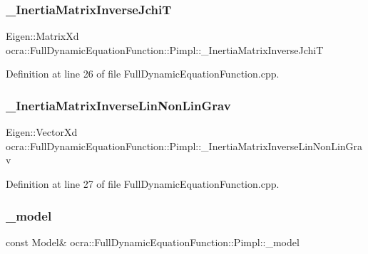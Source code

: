 \subsubsection{\texorpdfstring{\+\_\+\+Inertia\+Matrix\+Inverse\+JchiT}{\_InertiaMatrixInverseJchiT}}
{\footnotesize\ttfamily Eigen\+::\+Matrix\+Xd ocra\+::\+Full\+Dynamic\+Equation\+Function\+::\+Pimpl\+::\+\_\+\+Inertia\+Matrix\+Inverse\+JchiT}



Definition at line 26 of file Full\+Dynamic\+Equation\+Function.\+cpp.

\hypertarget{structFullDynamicEquationFunction_1_1Pimpl_a5b5154c8b3e5725507192b9055e2b298}{}\label{structFullDynamicEquationFunction_1_1Pimpl_a5b5154c8b3e5725507192b9055e2b298} 
\subsubsection{\texorpdfstring{\+\_\+\+Inertia\+Matrix\+Inverse\+Lin\+Non\+Lin\+Grav}{\_InertiaMatrixInverseLinNonLinGrav}}
{\footnotesize\ttfamily Eigen\+::\+Vector\+Xd ocra\+::\+Full\+Dynamic\+Equation\+Function\+::\+Pimpl\+::\+\_\+\+Inertia\+Matrix\+Inverse\+Lin\+Non\+Lin\+Grav}



Definition at line 27 of file Full\+Dynamic\+Equation\+Function.\+cpp.

\hypertarget{structFullDynamicEquationFunction_1_1Pimpl_a180b0f0401cc9ff23b24d974823215d9}{}\label{structFullDynamicEquationFunction_1_1Pimpl_a180b0f0401cc9ff23b24d974823215d9} 
\subsubsection{\texorpdfstring{\+\_\+model}{\_model}}
{\footnotesize\ttfamily const Model\& ocra\+::\+Full\+Dynamic\+Equation\+Function\+::\+Pimpl\+::\+\_\+model}



